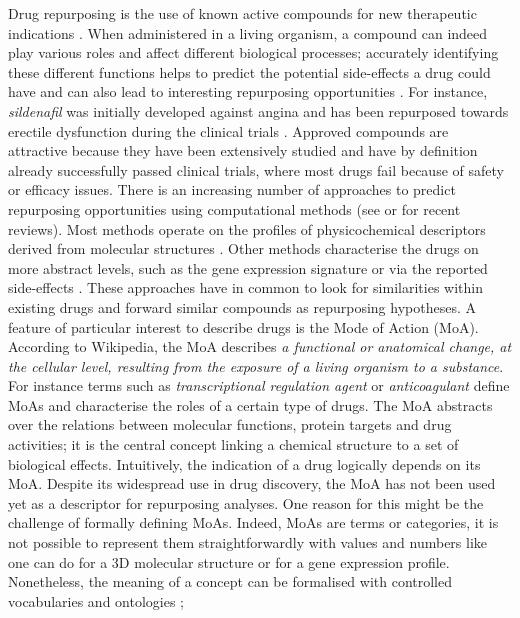 \documentclass{bioinfo}
\begin{document}
Drug repurposing is the use of known active compounds for new therapeutic indications \citep{Sanseau01072011}. 
When administered in a living organism, a compound can indeed play various roles and affect different biological processes; 
accurately identifying these different functions helps to predict the potential side-effects a drug could have and can also lead to 
interesting repurposing opportunities \citep{Medina-Franco2013}. For instance, \emph{sildenafil} was initially developed 
against angina and has been repurposed towards erectile dysfunction during the clinical trials \citep{Ashburn2004}. Approved compounds are 
attractive because they have been extensively studied and have by definition already successfully passed clinical trials, where 
most drugs fail because of safety or efficacy issues.
There is an increasing number of approaches to predict repurposing opportunities using computational methods (see \cite{dudley2011exploiting} or \cite{andronis2011literature} for recent reviews). Most 
methods operate on the profiles of physicochemical descriptors derived from molecular structures \citep{Haupt2011}. Other methods characterise 
the drugs on more abstract levels, such as the gene expression signature \citep{Iorio2010} or 
via the reported side-effects \citep{Campillos2008}. 
These approaches 
have in common to look for similarities within existing drugs and forward similar compounds as repurposing hypotheses.
A feature of particular interest to describe drugs is the Mode of Action (MoA). According to Wikipedia, 
the MoA describes \emph{a functional or anatomical change, 
at the cellular level, resulting from the exposure of a living organism to a substance}. For instance 
terms such as \emph{transcriptional regulation agent} or \emph{anticoagulant} define MoAs and characterise the 
roles of a certain type of drugs. The 
MoA abstracts over the relations between molecular functions, protein targets and drug activities; it is the central concept linking a 
chemical structure to a set of biological effects. Intuitively, the indication of a drug logically depends on its MoA.
Despite its widespread use in drug discovery, the MoA has not been used yet as a descriptor for repurposing analyses. One reason for this 
might be the challenge of formally defining MoAs. Indeed, MoAs are terms or categories, it is not possible to represent 
them straightforwardly with values and numbers like one can do for a 3D molecular structure or for a gene expression profile. 
Nonetheless, the meaning of a concept can be formalised with controlled vocabularies and ontologies \citep{Gruber1995}; 
\end{document}
